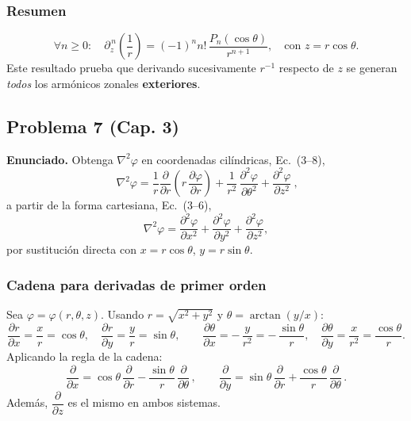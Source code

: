\documentclass{article}
\begin{document}
\subsubsection*{Resumen}
\[
\boxed{
\forall n\ge 0:\quad
\partial_z^{\,n}\!\left(\frac{1}{r}\right)=(-1)^{n}n!\,\frac{P_n(\cos\theta)}{r^{n+1}},
\quad\text{con } z=r\cos\theta.
}
\]
Este resultado prueba que derivando sucesivamente $r^{-1}$ respecto de $z$ se generan \emph{todos} los armónicos zonales \textbf{exteriores}.


\subsection{Problema 7 (Cap. 3)} \vspace{0.5cm}

\textbf{Enunciado.} Obtenga $\nabla^{2}\varphi$ en coordenadas cilíndricas, Ec.~(3–8),
\[
\boxed{\ \nabla^{2}\varphi
=\frac{1}{r}\frac{\partial}{\partial r}\!\left(r\,\frac{\partial\varphi}{\partial r}\right)
+\frac{1}{r^{2}}\,\frac{\partial^{2}\varphi}{\partial \theta^{2}}
+\frac{\partial^{2}\varphi}{\partial z^{2}}\ },
\]
a partir de la forma cartesiana, Ec.~(3–6),
\[
\nabla^{2}\varphi=\frac{\partial^{2}\varphi}{\partial x^{2}}
+\frac{\partial^{2}\varphi}{\partial y^{2}}
+\frac{\partial^{2}\varphi}{\partial z^{2}},
\]
por sustitución directa con $x=r\cos\theta$, $y=r\sin\theta$.

\subsubsection*{Cadena para derivadas de primer orden}
Sea $\varphi=\varphi(r,\theta,z)$. Usando $r=\sqrt{x^{2}+y^{2}}$ y $\theta=\arctan(y/x)$:
\[
\frac{\partial r}{\partial x}=\frac{x}{r}=\cos\theta,\quad
\frac{\partial r}{\partial y}=\frac{y}{r}=\sin\theta,\qquad
\frac{\partial \theta}{\partial x}=-\,\frac{y}{r^{2}}=-\,\frac{\sin\theta}{r},\quad
\frac{\partial \theta}{\partial y}=\frac{x}{r^{2}}=\frac{\cos\theta}{r}.
\]
Aplicando la regla de la cadena:
\[
\boxed{\ \frac{\partial}{\partial x}
=\cos\theta\,\frac{\partial}{\partial r}
-\frac{\sin\theta}{r}\,\frac{\partial}{\partial \theta}\,,\qquad
\frac{\partial}{\partial y}
=\sin\theta\,\frac{\partial}{\partial r}
+\frac{\cos\theta}{r}\,\frac{\partial}{\partial \theta}\, .\ }
\]
Además, $\dfrac{\partial}{\partial z}$ es el mismo en ambos sistemas.

\end{document}
